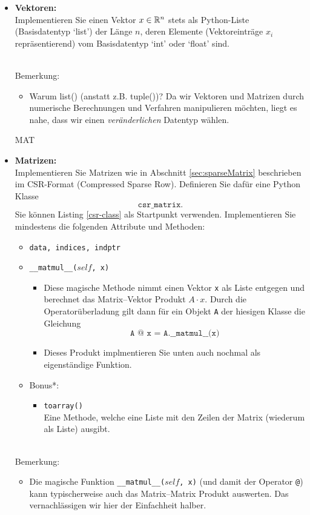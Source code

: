 	\begin{itemize}
		\item \textbf{Vektoren:}\\ Implementieren Sie einen Vektor $x \in {\mathbb{R}}^{n}$ stets als Python-Liste (Basisdatentyp `list') der Länge $n$, deren Elemente (Vektoreinträge $x_i$ repräsentierend) vom Basisdatentyp `int' oder `float' sind.\\
				{
			~\\
			Bemerkung: \vspace{-0.2cm}
			\begin{itemize}
				\item Warum list() (anstatt z.B. tuple())? Da wir Vektoren und Matrizen durch numerische Berechnungen und Verfahren manipulieren möchten, liegt es nahe, dass wir einen \textit{veränderlichen} Datentyp wählen.
		\end{itemize}}

	 MAT

		\item \textbf{Matrizen:}\\ Implementieren Sie Matrizen wie in Abschnitt \ref{sec:sparseMatrix} beschrieben im CSR-Format (Compressed Sparse Row). Definieren Sie dafür eine Python Klasse $$\texttt{csr\_matrix}.$$ Sie können Listing \ref{csr-class} als Startpunkt verwenden. Implementieren Sie mindestens die folgenden Attribute und Methoden:
		\begin{itemize}
			\item \texttt{data, indices, indptr}
			\item \texttt{\_\_matmul\_\_($self$, x)}
			\begin{itemize}
				\item Diese magische Methode nimmt einen Vektor \texttt{x} als Liste entgegen und berechnet das Matrix--Vektor Produkt $A\cdot x$. Durch die Operatorüberladung gilt dann für ein Objekt \texttt{A} der hiesigen Klasse die Gleichung
						$$\texttt{A @ x = A.\_\_matmul\_\_(x)} $$
				\item Dieses Produkt implmentieren Sie unten auch nochmal als eigenständige Funktion.
			\end{itemize}
			\item Bonus*:
			\begin{itemize}
				\item \texttt{toarray()}\\
				Eine Methode, welche eine Liste mit den Zeilen der Matrix (wiederum als Liste) ausgibt.
			\end{itemize}
		\end{itemize}
			{
		~\\
		Bemerkung:
		\begin{itemize}
			\item Die magische Funktion \texttt{\_\_matmul\_\_($self$, x)} (und damit der Operator \texttt{@}) kann typischerweise auch das Matrix--Matrix Produkt auswerten. Das vernachlässigen wir hier der Einfachheit halber.
	\end{itemize}}

	\end{itemize}





